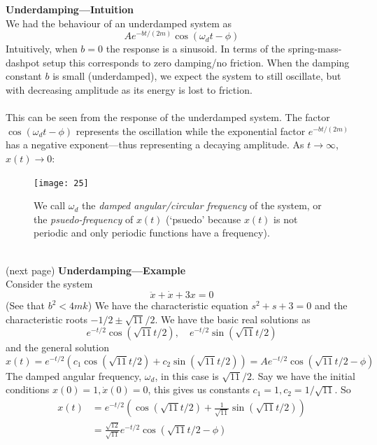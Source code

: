 \documentclass{report}
\begin{document}
\newpage
\noindent\textbf{Underdamping---Intuition}\\
We had the behaviour of an underdamped system as
\begin{equation*}
Ae^{-bt/(2m)}\cos(\omega_dt-\phi)
\end{equation*}
Intuitively, when $b=0$ the response is a sinusoid. In terms of the spring-mass-dashpot setup this corresponds to 
zero damping/no friction. When the damping constant $b$ is small (underdamped), we expect the system to still
oscillate, but with decreasing amplitude as its energy is lost to friction.\\
\vspace{1mm}\\
This can be seen from the response of the underdamped system. The factor $\cos(\omega_dt-\phi)$ represents
the oscillation while the exponential factor $e^{-bt/(2m)}$ has a negative exponent---thus representing 
a decaying amplitude. As $t\to\infty$, $x(t)\to0$:
\begin{figure}[h]
\begin{center}
\texttt{[image: 25]}\\
\end{center}
We call $\omega_d$ the \textit{damped angular/circular frequency} of the system, or the \textit{psuedo-frequency}
of $x(t)$ (`psuedo' because $x(t)$ is not periodic and only periodic functions have a frequency).
\end{figure}\\
(next page)
\newpage
\noindent\textbf{Underdamping---Example}\\
Consider the system
\begin{equation*}
\ddot{x}+\dot{x}+3x=0
\end{equation*}
(See that $b^2<4mk$) We have the characteristic equation 
$s^2+s+3=0$ and the characteristic roots $-1/2\pm\sqrt{11}/2$. We have the basic real solutions as
\begin{equation*}
e^{-t/2}\cos(\sqrt{11}t/2),\quad e^{-t/2}\sin(\sqrt{11}t/2)
\end{equation*}
and the general solution
\begin{equation*}
x(t)=e^{-t/2}(c_1\cos(\sqrt{11}t/2)+c_2\sin(\sqrt{11}t/2))
=Ae^{-t/2}\cos(\sqrt{11}t/2-\phi)
\end{equation*}
The damped angular frequency, $\omega_d$, in this case is $\sqrt{11}/2$. Say we have the initial conditions 
$x(0)=1,\dot{x}(0)=0$, this gives us constants $c_1=1,c_2=1/\sqrt{11}$. So
\begin{align*}
x(t)&=e^{-t/2}\left(\cos(\sqrt{11}t/2)+\frac{1}{\sqrt{11}}\sin(\sqrt{11}t/2)\right)\\
&=\frac{\sqrt{12}}{\sqrt{11}}e^{-t/2}\cos(\sqrt{11}t/2-\phi)
\end{align*}
\end{document}
